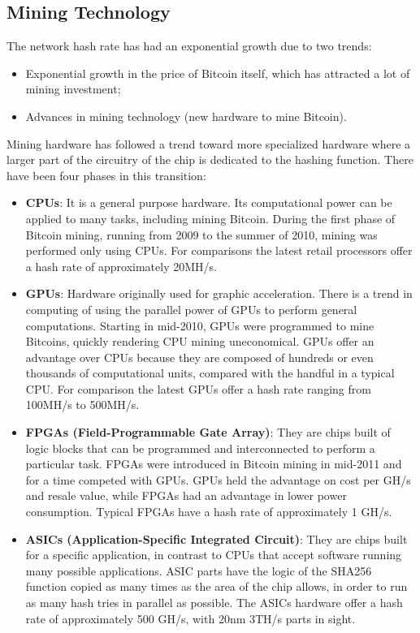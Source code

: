 \documentclass{article}
\begin{document}
\subsection*{Mining Technology}
The network hash rate has had an exponential growth due to two trends:
\begin{itemize}
    \item Exponential growth in the price of Bitcoin itself, which has attracted a lot of mining investment;
    \item Advances in mining technology (new hardware to mine Bitcoin).
\end{itemize}
Mining hardware has followed a trend toward more specialized hardware where a larger part of the circuitry of the chip is dedicated to the hashing function. There have been four phases in this transition:
\begin{itemize}
    \item \textbf{CPUs}: It is a general purpose hardware. Its computational power can be applied to many tasks, including mining Bitcoin. During the first phase of Bitcoin mining, running from 2009 to the summer of 2010, mining was performed only using CPUs. For comparisons the latest retail processors offer a hash rate of approximately 20MH/s.
    \item \textbf{GPUs}: Hardware originally used for graphic acceleration. There is a trend in computing of using the parallel power of GPUs to perform general computations. Starting in mid-2010, GPUs were programmed to mine Bitcoins, quickly rendering CPU mining uneconomical. GPUs offer an advantage over CPUs because they are composed of hundreds or even thousands of computational units, compared with the handful in a typical CPU. For comparison the latest GPUs offer a hash rate ranging from 100MH/s to 500MH/s.
    \item \textbf{FPGAs (Field-Programmable Gate Array)}: They are chips built of logic blocks that can be programmed and interconnected to perform a particular task. FPGAs were introduced in Bitcoin mining in mid-2011 and for a time competed with GPUs. GPUs held the advantage on cost per GH/s and resale value, while FPGAs had an advantage in lower power consumption. Typical FPGAs have a hash rate of approximately 1 GH/s.
    \item \textbf{ASICs (Application-Specific Integrated Circuit)}: They are chips built for a specific application, in contrast to CPUs that accept software running many possible applications. ASIC parts have the logic of the SHA256 function copied as many times as the area of the chip allows, in order to run as many hash tries in parallel as possible. The ASICs hardware offer a hash rate of approximately 500 GH/s, with 20nm 3TH/s parts in sight.
\end{itemize}
\end{document}
